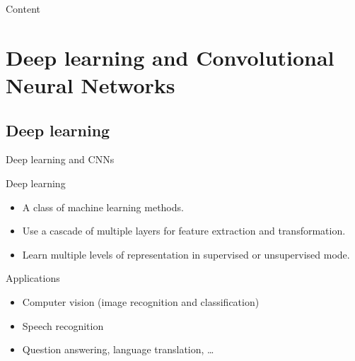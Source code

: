 \documentclass[10pt,svgnames]{beamer}
\begin{document}
\begin{frame}{Content}{}
\tableofcontents
\end{frame}
\section{Deep learning and Convolutional Neural Networks}
\subsection{Deep learning}
\begin{frame}{Deep learning and CNNs}{}

	\begin{block}{Deep learning\footnotemark[1]}
		\begin{itemize}
			\item A class of machine learning methods.
			\item Use a cascade of multiple layers for feature extraction and transformation.
			\item Learn multiple levels of representation in supervised or unsupervised mode.
		\end{itemize}
	\end{block}{}

	\begin{block}{Applications}
		\begin{itemize}
			\item Computer vision (image recognition and classification)
			\item Speech recognition
			\item Question answering, language translation, \ldots
		\end{itemize}
	\end{block}
	
\end{frame}
\end{document}
